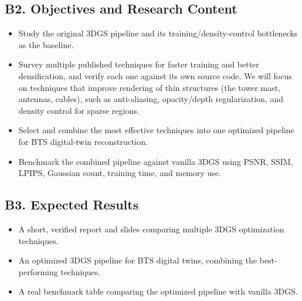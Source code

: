 \documentclass[a4paper,12pt]{article}
\begin{document}
\subsection*{B2. Objectives and Research Content}
\begin{itemize}[leftmargin=1.2em]
\item Study the original 3DGS pipeline and its training/density-control bottlenecks as the
baseline.
\item Survey multiple published techniques for faster training and better densification, and
verify each one against its own source code. We will focus on techniques that improve rendering
of thin structures (the tower mast, antennas, cables), such as anti-aliasing, opacity/depth
regularization, and density control for sparse regions.
\item Select and combine the most effective techniques into one optimized pipeline for BTS
digital-twin reconstruction.
\item Benchmark the combined pipeline against vanilla 3DGS using PSNR, SSIM, LPIPS, Gaussian
count, training time, and memory use.
\end{itemize}

\subsection*{B3. Expected Results}
\begin{itemize}[leftmargin=1.2em]
\item A short, verified report and slides comparing multiple 3DGS optimization techniques.
\item An optimized 3DGS pipeline for BTS digital twins, combining the best-performing techniques.
\item A real benchmark table comparing the optimized pipeline with vanilla 3DGS.
\end{itemize}
\end{document}
